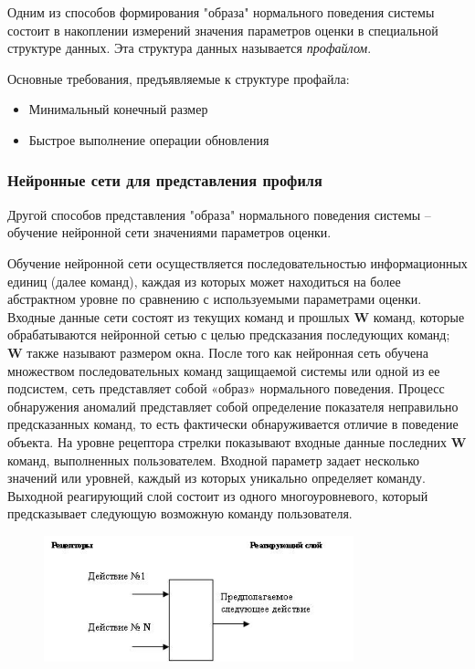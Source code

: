Одним из способов формирования "образа" нормального поведения системы состоит в
накоплении измерений значения параметров оценки в специальной структуре данных.
Эта структура данных называется \textit{профайлом}.\autocite{IDSystem}

Основные требования, предъявляемые к структуре профайла:
\begin{itemize}
	\item Минимальный конечный размер

	\item Быстрое выполнение операции обновления
\end{itemize}



\subsubsection{Нейронные сети для представления профиля}
Другой способов представления "образа" нормального поведения системы – обучение нейронной
сети значениями параметров оценки.

Обучение нейронной сети осуществляется последовательностью информационных единиц (далее команд),
каждая из которых может находиться на более абстрактном уровне по сравнению с используемыми
параметрами оценки. Входные данные сети состоят из текущих команд и прошлых \textbf{W} команд, которые
обрабатываются нейронной сетью с целью предсказания последующих команд; \textbf{W} также называют размером
окна. После того как нейронная сеть обучена множеством последовательных команд защищаемой системы или
одной из ее подсистем, сеть представляет собой «образ» нормального поведения. Процесс обнаружения
аномалий представляет собой определение показателя неправильно предсказанных команд,
то есть фактически обнаруживается отличие в поведение объекта. На уровне рецептора стрелки
показывают входные данные последних \textbf{W} команд, выполненных пользователем. Входной параметр задает
несколько значений или уровней, каждый из которых уникально определяет команду. Выходной реагирующий
слой состоит из одного многоуровневого, который предсказывает следующую возможную команду пользователя.
\autocite{BeynonDavies}

\begin{figure}[h!]
    \centering
    \includegraphics[width=0.8\textwidth]{assets/intrusion/neural_networks.jpg}
\end{figure}


